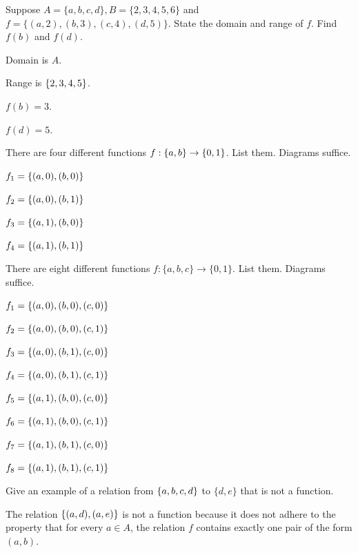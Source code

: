 \documentclass[openany, 12pt]{book}
\begin{document}
\begin{exercise}{}{}
	Suppose $A=\{a, b, c, d\}, B=\{2,3,4,5,6\}$ and\\
	$f=\{(a, 2),(b, 3),(c, 4),(d, 5)\}$. State the domain and range of $f$. Find
	$f(b)$ and $f(d)$.
	\tcblower
	\begin{alist}
		\item Domain is $A$.
		\item Range is $\{2, 3, 4, 5\}$.
		\item $f(b) = 3$.
		\item $f(d) = 5$.
	\end{alist}
\end{exercise}

\begin{exercise}{}{}
	There are four different functions $f:\{a, b\} \rightarrow\{0,1\}$. List
	them. Diagrams suffice.
	\tcblower
	\begin{alist}
		\item $f_1 = \{(a, 0), (b, 0)\}$
		\item $f_2 = \{(a, 0), (b, 1)\}$
		\item $f_3 = \{(a, 1), (b, 0)\}$
		\item $f_4 = \{(a, 1), (b, 1)\}$
	\end{alist}
\end{exercise}

\begin{exercise}{}{}
	There are eight different functions $f:\{a, b, c\} \rightarrow\{0,1\}$. List them. Diagrams suffice.
	\tcblower
	\begin{alist}
		\item $f_1 = \{(a, 0), (b, 0), (c, 0)\}$
		\item $f_2 = \{(a, 0), (b, 0), (c, 1)\}$
		\item $f_3 = \{(a, 0), (b, 1), (c, 0)\}$
		\item $f_4 = \{(a, 0), (b, 1), (c, 1)\}$
		\item $f_5 = \{(a, 1), (b, 0), (c, 0)\}$
		\item $f_6 = \{(a, 1), (b, 0), (c, 1)\}$
		\item $f_7 = \{(a, 1), (b, 1), (c, 0)\}$
		\item $f_8 = \{(a, 1), (b, 1), (c, 1)\}$
	\end{alist}
\end{exercise}

\begin{exercise}{}{}
	Give an example of a relation from $\{a, b, c, d\}$ to $\{d, e\}$ that is not a function.
	\tcblower
	\begin{alist}
		\item The relation $\{(a, d), (a, e)\}$ is not a function because it does not
		adhere to the property that for every $a \in A$, the relation $f$ contains
		exactly one pair of the form $(a, b)$.
	\end{alist}
\end{exercise}
\end{document}
